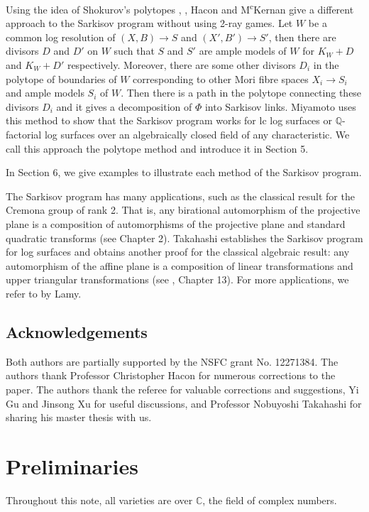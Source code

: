 \documentclass[11pt]{amsart}
\begin{document}
Using the idea of Shokurov's polytopes \cite{Sho96}, \cite{cs11}, Hacon and M\textsuperscript{c}Kernan \cite{haconSarkisovProgram2012} give a different approach to the Sarkisov program without using 2-ray games.
Let $W$ be a common log resolution of $(X,B)\to S$ and $(X',B')\to S'$, then there are divisors $D$ and $D'$ on $W$ such that $S$ and $S'$ are ample models of $W$ for $K_W+D$ and $K_W+D'$ respectively. 
Moreover, there are some other divisors $D_i$ in the polytope of boundaries of $W$ corresponding to other Mori fibre spaces $X_i\to S_i$ and ample models $S_i$ of $W$. Then there is a path in the polytope connecting these divisors $D_i$ and it gives a decomposition of $\Phi$ into Sarkisov links.
Miyamoto \cite{miyamoto2019TheSP} uses this method to show that the Sarkisov program works for lc log surfaces or $\mathbb{Q}$-factorial log surfaces over an algebraically closed field of any characteristic. 
We call this approach the polytope method and introduce it in Section 5. 

In Section 6, we give examples to illustrate each method of the Sarkisov program.

The Sarkisov program has many applications, such as the classical result for the Cremona group of rank 2. That is, any birational automorphism of the projective plane is a composition of automorphisms of the projective plane and standard quadratic transforms (see \cite{ksc04} Chapter 2). Takahashi \cite{tak95} establishes the Sarkisov program for log surfaces and obtains another proof for the classical algebraic result: any automorphism of the affine plane is a composition of linear transformations and upper triangular transformations (see \cite{mat02}, Chapter 13). For more applications, we refer to \cite{lam22} by Lamy.

\subsection*{Acknowledgements} Both authors are partially supported by the NSFC grant No. 12271384.
The authors thank Professor Christopher Hacon for numerous corrections to the paper. The authors thank the referee for valuable corrections and suggestions, Yi Gu and Jinsong Xu for useful discussions, and Professor Nobuyoshi Takahashi for sharing his master thesis \cite{tak95} with us. 


\section{Preliminaries}
Throughout this note, all varieties are over $\mathbb{C}$, the field of complex numbers.
\end{document}
